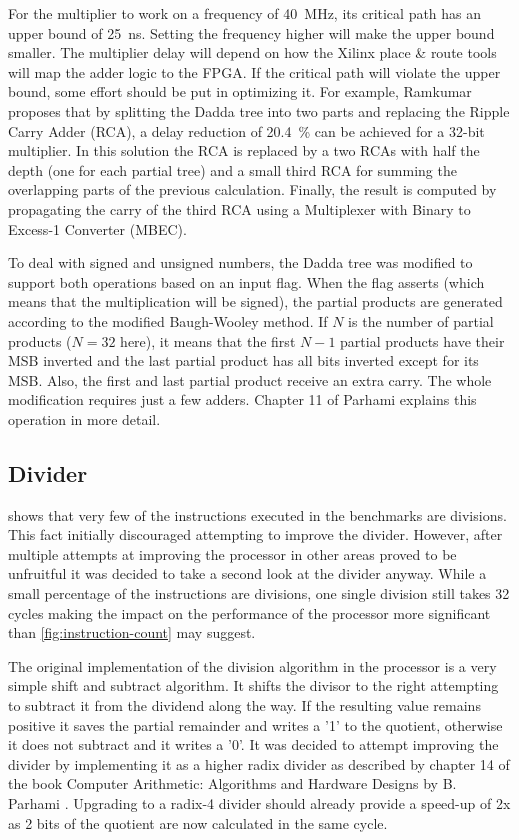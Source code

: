 \documentclass[final]{article}
\begin{document}
For the multiplier to work on a frequency of \SI{40}{\mega\hertz}, its critical path has an upper bound of \SI{25}{\nano\second}.
Setting the frequency higher will make the upper bound smaller.
The multiplier delay will depend on how the Xilinx place \& route tools will map the adder logic to the FPGA.
If the critical path will violate the upper bound, some effort should be put in optimizing it.
For example, Ramkumar \cite{ramkumar} proposes that by splitting the Dadda tree into two parts and replacing the Ripple Carry Adder (RCA), a delay reduction of \SI{20.4}{\percent} can be achieved for a 32-bit multiplier.
In this solution the RCA is replaced by a two RCAs with half the depth (one for each partial tree) and a small third RCA for summing the overlapping parts of the previous calculation.
Finally, the result is computed by propagating the carry of the third RCA using a Multiplexer with Binary to Excess-1 Converter (MBEC).

To deal with signed and unsigned numbers, the Dadda tree was modified to support both operations based on an input flag.
When the flag asserts (which means that the multiplication will be signed), the partial products are generated according to the modified Baugh-Wooley method.
If $N$ is the number of partial products ($N=32$ here), it means that the first $N-1$ partial products have their MSB inverted and the last partial product has all bits inverted except for its MSB.
Also, the first and last partial product receive an extra carry.
The whole modification requires just a few adders.
Chapter 11 of Parhami \cite{parhami} explains this operation in more detail.

\subsection{Divider}
 shows that very few of the instructions executed in the benchmarks are divisions.
This fact initially discouraged attempting to improve the divider.
However, after multiple attempts at improving the processor in other areas proved to be unfruitful it was decided to take a second look at the divider anyway.
While a small percentage of the instructions are divisions, one single division still takes 32 cycles making the impact on the performance of the processor more significant than \cref{fig:instruction-count} may suggest. 

The original implementation of the division algorithm in the processor is a very simple shift and subtract algorithm.
It shifts the divisor to the right attempting to subtract it from the dividend along the way.
If the resulting value remains positive it saves the partial remainder and writes a '1' to the quotient, otherwise it does not subtract and it writes a '0'.
It was decided to attempt improving the divider by implementing it as a higher radix divider as described by chapter 14 of the book Computer Arithmetic: Algorithms and Hardware Designs by B. Parhami \cite{parhami}.
Upgrading to a radix-4 divider should already provide a speed-up of 2x as 2 bits of the quotient are now calculated in the same cycle.
\end{document}
